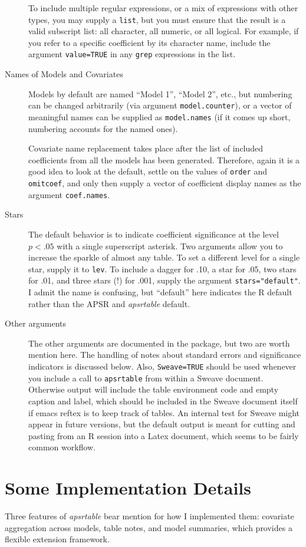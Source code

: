 \documentclass[10pt]{article} %
\begin{document}
\begin{description}
  To include multiple regular expressions, or a mix of expressions with
  other types, you may supply a \verb|list|, but you must ensure that
  the result is a valid subscript list: all character, all numeric, or
  all logical. For example, if you refer to a specific coefficient by
  its character name, include the argument \verb|value=TRUE| in any
  \verb|grep| expressions in the list.
\item[Names of Models and Covariates] Models by default are named ``Model 1'', ``Model 2'', etc., but numbering can be changed arbitrarily (via argument \verb|model.counter|), or a vector of meaningful names can be supplied as \verb|model.names| (if it comes up short, numbering accounts for the named ones).

Covariate name replacement takes place after the list of included coefficients from all the models has been generated. Therefore, again it is a good idea to look at the default, settle on the values of \verb|order| and \verb|omitcoef|, and only then supply a vector of coefficient display names as the argument \verb|coef.names|.
\item[Stars] The default behavior is to indicate coefficient significance at the level $p<.05$ with a single superscript asterisk. Two arguments allow you to increase the sparkle of almost any table. To set a different level for a single star, supply it to \verb|lev|. To include a dagger for .10, a star for .05, two stars for .01, and three stars (!) for .001, supply the argument \verb|stars="default"|. I admit the name is confusing, but ``default'' here indicates the R default rather than the APSR and \textit{apsrtable} default.
\item[Other arguments] The other arguments are documented in the package, but two are worth mention here. The handling of notes about standard errors and significance indicators is discussed below. Also, \verb|Sweave=TRUE| should be used whenever you include a call to \verb|apsrtable| from within a Sweave document. Otherwise output will include the table environment code and empty caption and label, which should be included in the Sweave document itself if emacs reftex is to keep track of tables. An internal test for Sweave might appear in future versions, but the default output is meant for cutting and pasting from an R session into a Latex document, which seems to be fairly common workflow.
\end{description}

\section{Some Implementation Details}
\label{sec:implementation}
Three features of \textit{apsrtable} bear mention for how I implemented them: covariate aggregation across models, table notes, and model summaries, which provides a flexible extension framework.
\end{document}

